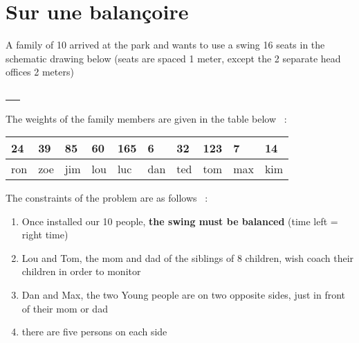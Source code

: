 

\chapter{Sur une balançoire}
\label{sec:balancoire}


A family of 10 arrived at the park and wants to use a swing
16 seats in the schematic drawing below (seats are spaced
1 meter, except the 2 separate head offices 2 meters)

\begin{center}
    \underline{
      ~~~ 
    }

\raisebox{2ex}{$\Delta$}
\end{center}
The weights of the family members are given in the table below ~:

\begin{center}
    \begin{tabular}{|l|l|l|l|l|l|l|l|l|l|}
        \hline
        24&39 &85 &60 &165 &6  &32 &123 &7  &14 \\
        \hline
        ron&zoe&jim&lou&luc &dan&ted&tom&max&kim\\
        \hline
    \end{tabular}
\end{center}

The constraints of the problem are as follows ~:
\begin{enumerate}
 \item Once installed our 10 people, \textbf{the swing must be balanced} (time left = right time)
 \item Lou and Tom, the mom and dad of the siblings of 8 children, wish
coach their children in order to monitor
 \item Dan and Max, the two
Young people are on two opposite sides, just in front of their mom or dad
 \item there are five persons on each side
\end{enumerate}

